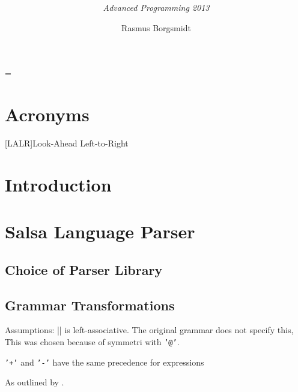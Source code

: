 \documentclass[
paper=a4,
oneside,
fontsize=11pt,
numbers=noenddot,
headinclude=false, %
footinclude=false, %
fleqn,             %
DIV=8
]{scrartcl}
\newcommand{\acrofont}[1]{\textrm{\textmd{#1}}}
\DeclareRobustCommand{\spacedlowsmallcaps}[1]{\MakeTextLowercase{\textsc{\lowsmallcapsspacing{#1}}}}%
\begin{document}
\title{\textcolor{spot}{\rmfamily\mdseries\spacedlowsmallcaps{Exam Report}}}
\subtitle{\rmfamily\mdseries\itshape\normalsize{Advanced Programming 2013}}
\author{\large Rasmus Borgsmidt}
\date{}
\maketitle
{}
\setcounter{tocdepth}{1} %
\manualmark
\vspace{-30pt}\tableofcontents
\vspace{30pt}

\font%
\font%
\font=\font%

\section*{Acronyms}
\begin{acronym}[DRY]
  [\acrofont{LALR}]{Look-Ahead Left-to-Right}
\end{acronym}

\section*{Introduction}

\section{Salsa Language Parser}

\subsection{Choice of Parser Library}

\subsection{Grammar Transformations}

Assumptions: || is left-associative. The original grammar does not specify this,
This was chosen because of symmetri with {\tt '@'}.

{\tt '+'} and {\tt '-'} have the same precedence for expressions

As outlined by \citet[p.~69]{mogensen2011}.
\end{document}
